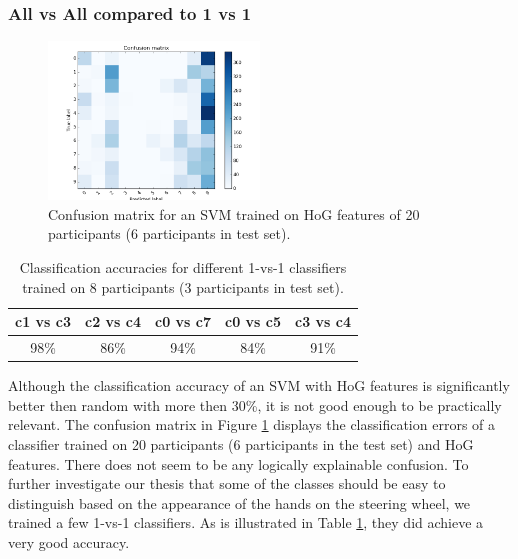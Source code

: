 \documentclass[10pt,twocolumn,letterpaper]{article}
\begin{document}
	\subsubsection{All vs All compared to 1 vs 1}
	\begin{figure}[h]
		\centering
		\includegraphics[width=0.5\textwidth]{handpose_plot_20p_c9}
		\caption{Confusion matrix for an SVM trained on HoG features of 20 participants (6 participants in test set).}
		\label{hand_estimation_cm}
	\end{figure}
	\begin{table}
		\begin{tabular}{c|c|c|c|c}
			c1 vs c3 & c2 vs c4 & c0 vs c7 & c0 vs c5 & c3 vs c4 \\ 
			\hline 
			98\% & 86\% & 94\% & 84\% & 91\% \\ 
		\end{tabular} 
		\caption{Classification accuracies for different 1-vs-1 classifiers trained on 8 participants (3 participants in test set).}
		\label{hand_estimation_1vs1}
	\end{table}
	Although the classification accuracy of an SVM with HoG features is significantly better then random with more then 30\%, it is not good enough to be practically relevant. The confusion matrix in Figure \ref{hand_estimation_cm} displays the classification errors of a classifier trained on 20 participants (6 participants in the test set) and HoG features. There does not seem to be any logically explainable confusion. To further investigate our thesis that some of the classes should be easy to distinguish based on the appearance of the hands on the steering wheel, we trained a few 1-vs-1 classifiers. As is illustrated in Table \ref{hand_estimation_1vs1}, they did achieve a very good accuracy. 
	
	
\end{document}
